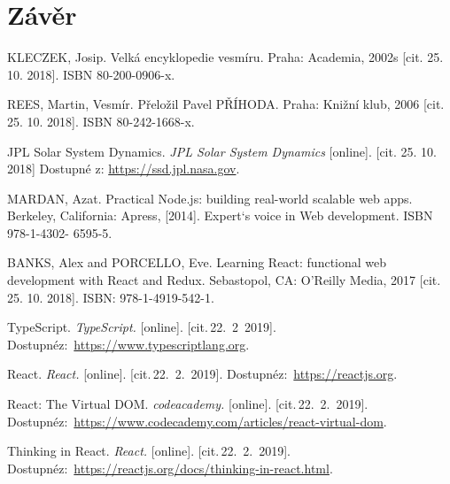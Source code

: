\documentclass[a4paper,12pt]{article}
\begin{document}
\section*{Závěr}



\clearpage {} {}

\begin{thebibliography}{99}	%


KLECZEK, Josip. Velká encyklopedie vesmíru. Praha: Academia, 2002s [cit. 25. 10. 2018]. ISBN 80-200-0906-x.

REES, Martin, Vesmír. Přeložil Pavel PŘÍHODA. Praha: Knižní klub, 2006 [cit. 25. 10. 2018]. ISBN 80-242-1668-x.

JPL Solar System Dynamics. \textit{JPL Solar System Dynamics} [online]. [cit. 25. 10. 2018] Dostupné z: \url{https://ssd.jpl.nasa.gov}.

MARDAN, Azat. Practical Node.js: building real-world scalable web apps. Berkeley, California: Apress, [2014]. Expert‘s voice in Web development. ISBN 978-1-4302- 6595-5.

BANKS, Alex and PORCELLO, Eve. Learning React: functional web development with React and Redux. Sebastopol, CA: O'Reilly Media, 2017 [cit. 25. 10. 2018]. ISBN: 978-1-4919-542-1.

TypeScript. 
\textit{TypeScript.} [online]. [cit.\,22.~2~2019]. 
Dostupné\newline z:~{\ttfamily \url{https://www.typescriptlang.org}}.

React. 
\textit{React.} [online]. [cit.\,22.~2.~2019]. 
Dostupné\newline z:~{\ttfamily \url{https://reactjs.org}}.

React: The Virtual DOM.
\textit{codeacademy.} [online]. [cit.\,22.~2.~2019]. 
Dostupné\newline z:~{\ttfamily \url{https://www.codecademy.com/articles/react-virtual-dom}}.

Thinking in React.
\textit{React.} [online]. [cit.\,22.~2.~2019]. 
Dostupné\newline z:~{\ttfamily \url{https://reactjs.org/docs/thinking-in-react.html}}.


\end{thebibliography}
\end{document}
